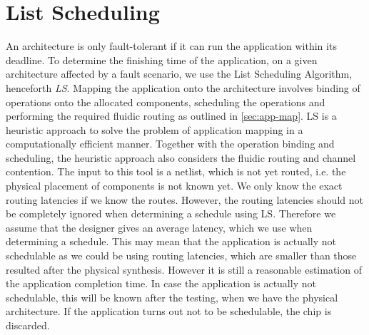 

\section{List Scheduling}
\label{sec:list-scheduling}
An architecture is only fault-tolerant if it can run the application within its deadline. To determine the finishing time of the application, on a given architecture affected by a fault scenario, we use the List Scheduling Algorithm, henceforth \emph{LS}. Mapping the application onto the architecture involves binding of operations onto the allocated components, scheduling the operations and performing the required fluidic routing as outlined in \autoref{sec:app-map}. LS is a heuristic approach to solve the problem of application mapping in a computationally efficient manner. Together with the operation binding and scheduling, the heuristic approach also considers the fluidic routing and channel contention. The input to this tool is a netlist, which is not yet routed, i.e. the physical placement of components is not known yet. We only know the exact routing latencies if we know the routes. However, the routing latencies should not be completely ignored when determining a schedule using LS. Therefore we assume that the designer gives an average latency, which we use when determining a schedule. This may mean that the application is actually not schedulable as we could be using routing latencies, which are smaller than those resulted after the physical synthesis. However it is still a reasonable estimation of the application completion time. In case the application is actually not schedulable, this will be known after the testing, when we have the physical architecture. If the application turns out not to be schedulable, the chip is discarded.

